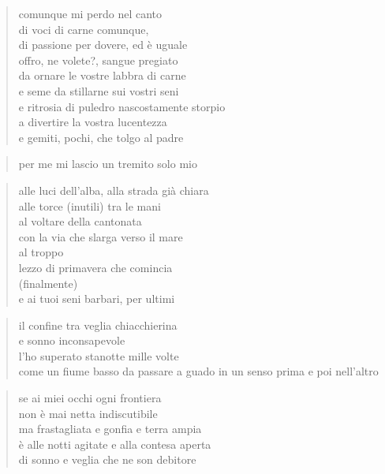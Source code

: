 \clearpage


\begin{verse}
    comunque mi perdo nel canto\\
    di voci di carne comunque,\\
    di passione per dovere, ed è uguale\\
    offro, ne volete?, sangue pregiato\\
    da ornare le vostre labbra di carne\\
    e seme da stillarne sui vostri seni\\
    e ritrosia di puledro nascostamente storpio\\
    a divertire la vostra lucentezza\\
    e gemiti, pochi, che tolgo al padre
\end{verse}

\begin{verse}
    per me mi lascio un tremito solo mio
\end{verse}


\begin{verse}
    alle luci dell'alba, alla strada già chiara\\
    alle torce (inutili) tra le mani\\
    al voltare della cantonata\\
    con la via che slarga verso il mare\\
    al troppo\\
    lezzo di primavera che comincia\\
    (finalmente)\\
    e ai tuoi seni barbari, per ultimi
\end{verse}

\clearpage


\begin{verse}
    il confine tra veglia chiacchierina\\
    e sonno inconsapevole\\
    l’ho superato stanotte mille volte\\
    come un fiume basso da passare a guado
    in un senso prima e poi nell’altro
\end{verse}

\begin{verse}
    se ai miei occhi ogni frontiera\\
    non è mai netta indiscutibile\\
    ma frastagliata e gonfia e terra ampia\\
    è alle notti agitate e alla contesa aperta\\
    di sonno e veglia che ne son debitore
\end{verse}

